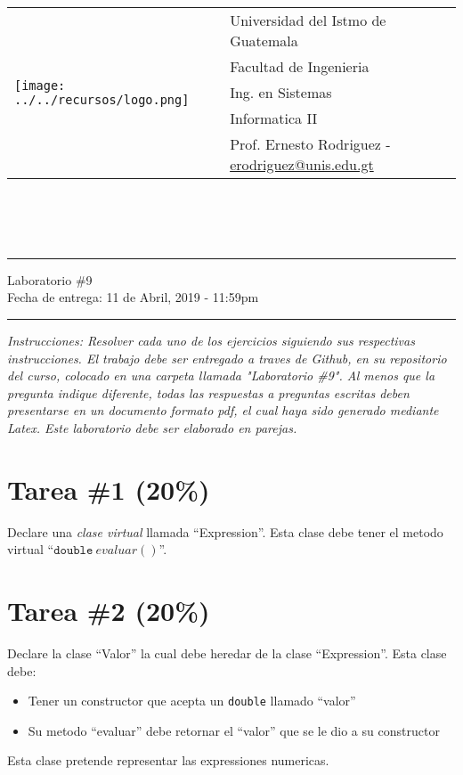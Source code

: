 \documentclass{article}
\newcommand{\horrule}[1]{\rule{\linewidth}{#1}}
\begin{document}
\begin{tabular}{l l}
\multirow{5}{*}{\texttt{[image: ../../recursos/logo.png]}} & Universidad del Istmo de Guatemala \\
 & Facultad de Ingenieria \\
 & Ing. en Sistemas \\
 & Informatica II \\
 & Prof. Ernesto Rodriguez - \href{mailto:erodriguez@unis.edu.gt}{erodriguez@unis.edu.gt} \\
\end{tabular}
\\\\\\

\begin{center}
        \horrule{0.5pt}
        \huge{Laboratorio \#9} \\
        \large{Fecha de entrega: 11 de Abril, 2019 - 11:59pm} \\
        \horrule{1pt}
\end{center}

\emph{Instrucciones: Resolver cada uno de los ejercicios siguiendo sus respectivas
instrucciones. El trabajo debe ser entregado a traves de Github, en su repositorio del curso, colocado en una carpeta llamada "Laboratorio \#9".
Al menos que la pregunta indique diferente, todas las respuestas a preguntas escritas deben presentarse en
un documento formato pdf, el cual haya sido generado mediante Latex. Este laboratorio
debe ser elaborado en parejas.}

\section*{Tarea \#1 (20\%)}

Declare una \emph{clase virtual} llamada ``Expression''. Esta clase debe tener el metodo
virtual ``$\mathtt{double}\ evaluar()$''.

\section*{Tarea \#2 (20\%)}

Declare la clase ``Valor'' la cual debe heredar de la clase ``Expression''. Esta clase
debe:
\begin{itemize}
        \item{Tener un constructor que acepta un \texttt{double} llamado ``valor''}
        \item{Su metodo ``evaluar'' debe retornar el ``valor'' que se le dio a su constructor}
\end{itemize}
Esta clase pretende representar las expressiones numericas.
\end{document}
